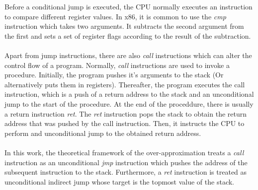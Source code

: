 \documentclass{kththesis}
\begin{document}
Before a conditional jump is executed, the CPU normally executes an instruction to compare different register values. In x86, it is common to use the \textit{cmp} instruction which takes two arguments. It subtracts the second argument from the first and sets a set of register flags according to the result of the subtraction. %
\\ \\
Apart from jump instructions, there are also \textit{call} instructions which can alter the control flow of a program. Normally, \textit{call} instructions are used to invoke a procedure. Initially, the program pushes it's arguments to the stack (Or alternatively puts them in registers). Thereafter, the program executes the call instruction, which is a push of a return address to the stack and an unconditional jump to the start of the procedure. At the end of the proceddure, there is usually a return instruction \textit{ret}. The \textit{ret} instruction pops the stack to obtain the return address that was pushed by the call instruction. Then, it instructs the CPU to perform and unconditional jump to the obtained return address. 
\\ \\ 
In this work, the theoretical framework of the over-approximation treats a \textit{call} instruction as an unconditional \textit{jmp} instruction which pushes the address of the subsequent instruction to the stack. Furthermore, a \textit{ret} instruction is treated as unconditional indirect jump whose target is the topmost value of the stack.
\end{document}
